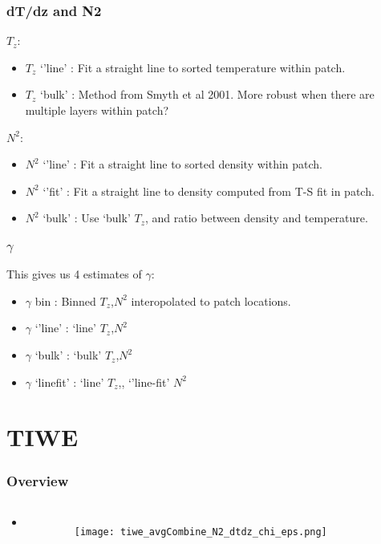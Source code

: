 \documentclass{beamer}
\begin{document}
\begin{frame}
 \frametitle{dT/dz and N2}
 
$T_z$:
\begin{itemize}
\item $T_z$ `'line' : Fit a straight line to sorted temperature within patch.
\item $T_z$ `bulk' : Method from Smyth et al 2001. More robust when there are multiple layers within patch?
\end{itemize}

$N^2$:
\begin{itemize}
\item $N^2$ `'line' : Fit a straight line to sorted density within patch.
\item $N^2$ `'fit' : Fit a straight line to density computed from T-S fit in patch.
\item $N^2$ `bulk' : Use `bulk' $T_z$, and ratio between density and temperature.
\end{itemize}


\end{frame}




\begin{frame}
 \frametitle{$\gamma$}

This gives us 4 estimates of $\gamma$: 
\begin{itemize}
\item $\gamma$ bin : Binned $T_z$,$N^2$ interopolated to patch locations.
\item $\gamma$ `'line' : `line' $T_z$,$N^2$
\item $\gamma$ `bulk' : `bulk' $T_z$,$N^2$
\item $\gamma$ `linefit' : `line' $T_z$,, `'line-fit' $N^2$
\end{itemize}

\end{frame}



\section{TIWE}


\begin{frame}
 \frametitle{Overview}

\begin{columns}
\begin{itemize}
\item 
\end{itemize}

\begin{figure}[htbp]
\begin{center}
\texttt{[image: tiwe\_avgCombine\_N2\_dtdz\_chi\_eps.png]}
\caption{}
\label{default}
\end{center}
\end{figure}

\end{columns}


\end{frame}
\end{document}
